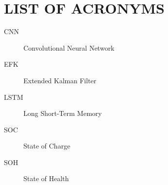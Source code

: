 
{}

\chapter*{LIST OF ACRONYMS}

\begin{description}
    \item[CNN] Convolutional Neural Network
    \item[EFK] Extended Kalman Filter
    \item[LSTM] Long Short-Term Memory
    \item[SOC] State of Charge
    \item[SOH] State of Health
\end{description}

\cleardoublepage
